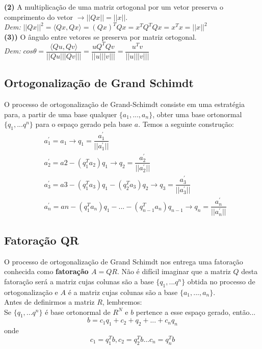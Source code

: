 \documentclass[12pt]{article}
\begin{document}
\textbf{(2)} A multiplicação de uma matriz ortogonal por um vetor preserva o comprimento do vetor $\rightarrow ||Qx||=||x||$. \\

\textit{Dem:} $||Qx||^2 = \langle Qx,Qx \rangle=(Qx)^TQx=x^TQ^TQx=x^Tx=||x||^2$\\

\textbf{(3))} O ângulo entre vetores se preserva por matriz ortogonal.\\

\textit{Dem:} $cos\theta=\dfrac{\langle Qu,Qv \rangle}{||Qu|||Qv|||}=\dfrac{uQ^TQv}{||u|||v|||}=\dfrac{u^Tv}{||u|||v|||}$

\subsection{Ortogonalização de Grand Schimdt}

O processo de ortogonalização de Grand-Schimdt consiste em uma estratégia para, a partir de uma base qualquer $\{a_1,...,a_n\}$, obter uma base ortonormal $\{q_1,...q^n\}$ para o espaço gerado pela base $a$. Temos a seguinte construção:
\begin{align*}
	&a_1^{'}=a_1 \rightarrow q_1=\dfrac{a_1^{'}}{||a_1^{'}||}\\
	&a_2^{'}=a2-(q_1^Ta_2)q_1 \rightarrow q_2=\dfrac{a_2^{'}}{||a_2^{'}||}\\
	&a_3^{'}=a3-(q_1^Ta_3)q_1 -(q_2^Ta_3)q_2\rightarrow q_3=\dfrac{a_3^{'}}{||a_3^{'}||}\\
	&a_n^{'}=an-(q_1^Ta_n)q_1 -...-(q_{n-1}^Ta_n)q_{n-1}\rightarrow q_n=\dfrac{a_n^{'}}{||a_n^{'}||}
\end{align*}


\subsection{Fatoração QR}

O processo de ortogonalização de Grand Schimdt nos entrega uma fatoração conhecida como \textbf{fatoração $A=QR$}. Não é difícil imaginar que a matriz $Q$ desta fatoração será a matriz cujas colunas são a base $\{q_1,...q^n\}$ obtida no processo de ortogonalização e $A$ é a matriz cujas colunas são a base $\{a_1,...,a_n\}$.\\

Antes de definirmos a matriz $R$, lembremos:\\	

Se $\{q_1,...q^n\}$ é base ortonormal de $R^N$ e $b$ pertence a esse espaço gerado, então...
\begin{equation*}
	b=c_1q_1+c_2+q_2+...+c_nq_n
\end{equation*}
onde
\begin{equation*}
	c_1=q_1^Tb, c_2=q_2^Tb... c_n=q_n^Tb
\end{equation*} 
\end{document}
